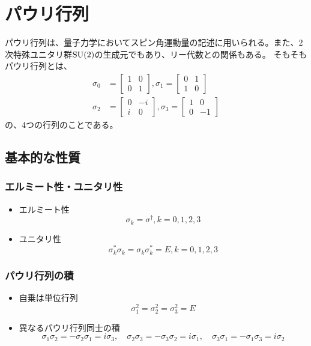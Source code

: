 \section{パウリ行列}
パウリ行列は、量子力学においてスピン角運動量の記述に用いられる。また、2次特殊ユニタリ群$\text{SU}(2)$の生成元でもあり、リー代数との関係もある。
そもそもパウリ行列とは、
\begin{align}
  \sigma_0 &=
  \begin{bmatrix}
    1 & 0 \\
    0 & 1
  \end{bmatrix},
  \sigma_1 =
  \begin{bmatrix}
    0 & 1 \\
    1 & 0
  \end{bmatrix} \\
  \sigma_2 &=
  \begin{bmatrix}
    0 & -i \\
    i & 0
  \end{bmatrix},
  \sigma_3 =
  \begin{bmatrix}
    1 & 0 \\
    0 & -1
  \end{bmatrix}
\end{align}
の、4つの行列のことである。

\subsection{基本的な性質}
\subsubsection{エルミート性・ユニタリ性}
\begin{itemize}
  \item エルミート性
  $$
    \sigma_k = \sigma^\dagger,k = 0,1,2,3
  $$
  \item ユニタリ性
  $$
    \sigma_k^* \sigma_k = \sigma_k\sigma_k^* = E,k = 0,1,2,3
  $$
\end{itemize}

\subsubsection{パウリ行列の積}
\begin{itemize}
  \item 自乗は単位行列
  $$
  \sigma_1^2 = \sigma_2^2 = \sigma_3^2 = E
  $$

  \item 異なるパウリ行列同士の積
  $$
    \sigma_{1} \sigma_{2}=-\sigma_{2} \sigma_{1}=i \sigma_{3},
    \quad \sigma_{2} \sigma_{3}=-\sigma_{3} \sigma_{2}=i \sigma_{1},
    \quad \sigma_{3} \sigma_{1}=-\sigma_{1} \sigma_{3}=i \sigma_{2}
  $$
\end{itemize}

